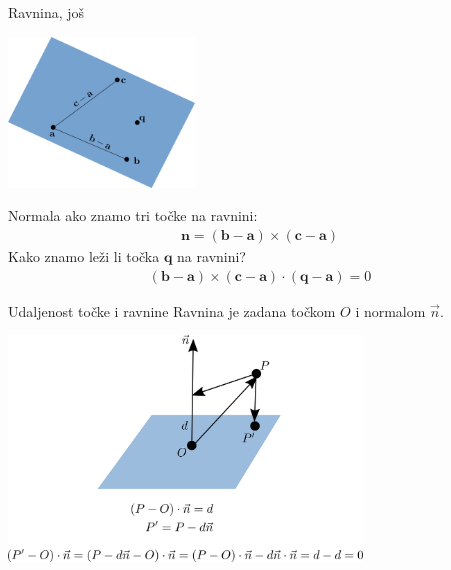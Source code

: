 \documentclass[9pt]{beamer}
\begin{document}
\begin{frame}{Ravnina, još}
	\begin{center}
		\includegraphics[height=4cm]{./slike/ravnina_01_02.png}
	\end{center}
	Normala ako znamo tri točke na ravnini:
	\begin{align*}
		\mathbf{n} = (\mathbf{b} - \mathbf{a}) \times (\mathbf{c} - \mathbf{a})
	\end{align*}
	Kako znamo leži li točka $\mathbf{q}$ na ravnini? \\
	\begin{align*}
	 (\mathbf{b} - \mathbf{a}) \times (\mathbf{c} - \mathbf{a}) \cdot (\mathbf{q} - \mathbf{a}) = 0
	\end{align*}	
	
\end{frame}
\begin{frame}{Udaljenost točke i ravnine}
	Ravnina je zadana točkom $O$ i normalom $\vec{n}$.
	\begin{center}
		\includegraphics[height=6cm]{./slike/linear_algebra_plane_point_distance.png}
	\end{center}
\end{frame}
\end{document}
